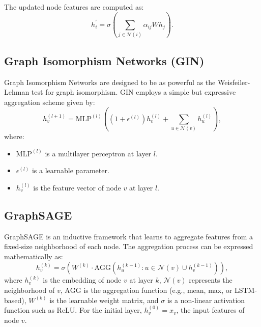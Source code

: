 The updated node features are computed as:
\begin{equation}
h_i^{\prime} = \sigma\left(\sum_{j \in \mathcal{N}(i)} \alpha_{ij} W h_j\right).
\end{equation}

\bigskip
\subsection{Graph Isomorphism Networks (GIN)}

Graph Isomorphism Networks \cite{xu2018powerful} are designed to be as powerful as the Weisfeiler-Lehman test for graph isomorphism. GIN employs a simple but expressive aggregation scheme given by:
\begin{equation}
h_v^{(l+1)} = \text{MLP}^{(l)}\left((1 + \epsilon^{(l)}) h_v^{(l)} + \sum_{u \in \mathcal{N}(v)} h_u^{(l)}\right),
\end{equation}
where:
\begin{itemize}
	\item $\text{MLP}^{(l)}$ is a multilayer perceptron at layer $l$.
	\item $\epsilon^{(l)}$ is a learnable parameter.
	\item $h_v^{(l)}$ is the feature vector of node $v$ at layer $l$.
\end{itemize}


\bigskip
\subsection{GraphSAGE}

GraphSAGE \cite{hamilton2017inductive} is an inductive framework that learns to aggregate features from a fixed-size neighborhood of each node. The aggregation process can be expressed mathematically as:
\begin{equation}
	h_v^{(k)} = \sigma\left( W^{(k)} \cdot \text{AGG}\left( { h_u^{(k-1)} : u \in \mathcal{N}(v) } \cup { h_v^{(k-1)} } \right) \right),
\end{equation}
where $h_v^{(k)}$ is the embedding of node $v$ at layer $k$, $\mathcal{N}(v)$ represents the neighborhood of $v$, $\text{AGG}$ is the aggregation function (e.g., mean, max, or LSTM-based), $W^{(k)}$ is the learnable weight matrix, and $\sigma$ is a non-linear activation function such as ReLU. For the initial layer, $h_v^{(0)} = x_v$, the input features of node $v$.


